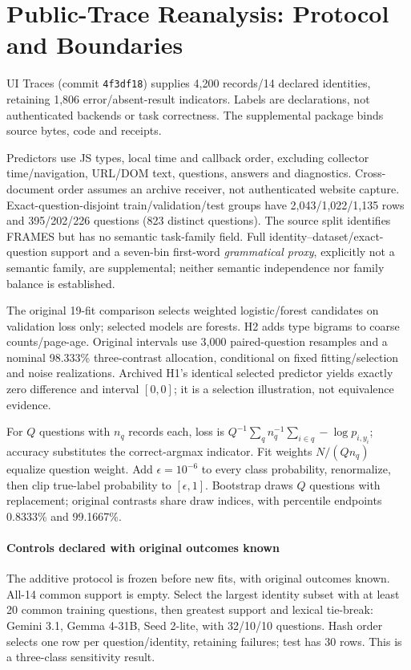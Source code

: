 \section{Public-Trace Reanalysis: Protocol and Boundaries}
\label{app:public-traces}
UI Traces (commit \texttt{4f3df18}) supplies 4,200 records/14 declared identities, retaining 1,806 error/absent-result indicators. Labels are declarations, not authenticated backends or task correctness. The supplemental package binds source bytes, code and receipts.

Predictors use JS types, local time and callback order, excluding collector time/navigation, URL/DOM text, questions, answers and diagnostics. Cross-document order assumes an archive receiver, not authenticated website capture. Exact-question-disjoint train/validation/test groups have 2,043/1,022/1,135 rows and 395/202/226 questions (823 distinct questions). The source split identifies FRAMES but has no semantic task-family field. Full identity--dataset/exact-question support and a seven-bin first-word \emph{grammatical proxy}, explicitly not a semantic family, are supplemental; neither semantic independence nor family balance is established.

The original 19-fit comparison selects weighted logistic/forest candidates on validation loss only; selected models are forests. H2 adds type bigrams to coarse counts/page-age. Original intervals use 3,000 paired-question resamples and a nominal 98.333\% three-contrast allocation, conditional on fixed fitting/selection and noise realizations. Archived H1's identical selected predictor yields exactly zero difference and interval $[0,0]$; it is a selection illustration, not equivalence evidence.

For $Q$ questions with $n_q$ records each, loss is $Q^{-1}\sum_q n_q^{-1}\sum_{i\in q}-\log p_{i,y_i}$; accuracy substitutes the correct-argmax indicator. Fit weights $N/(Qn_q)$ equalize question weight. Add $\epsilon=10^{-6}$ to every class probability, renormalize, then clip true-label probability to $[\epsilon,1]$. Bootstrap draws $Q$ questions with replacement; original contrasts share draw indices, with percentile endpoints 0.8333\% and 99.1667\%.

\paragraph{Controls declared with original outcomes known}
The additive protocol is frozen before new fits, with original outcomes known. All-14 common support is empty. Select the largest identity subset with at least 20 common training questions, then greatest support and lexical tie-break: Gemini 3.1, Gemma 4-31B, Seed 2-lite, with 32/10/10 questions. Hash order selects one row per question/identity, retaining failures; test has 30 rows. This is a three-class sensitivity result.

